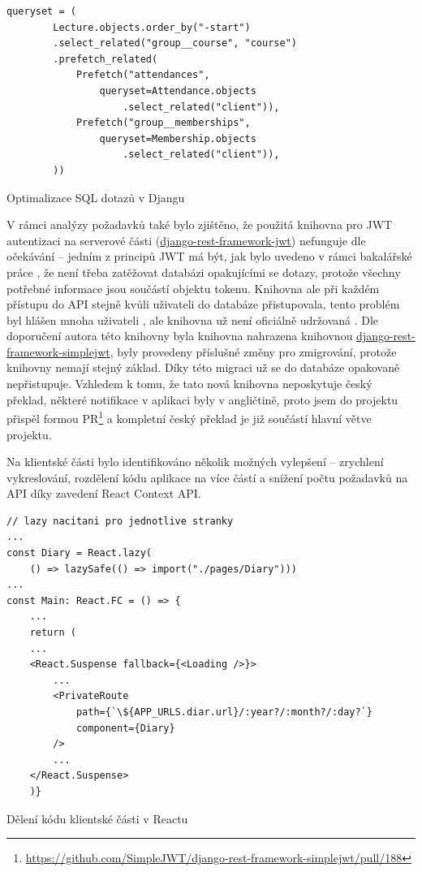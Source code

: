\begin{listing}[ht]
	\begin{verbatim}
queryset = (
        Lecture.objects.order_by("-start")
        .select_related("group__course", "course")
        .prefetch_related(
            Prefetch("attendances",
                queryset=Attendance.objects
                    .select_related("client")),
            Prefetch("group__memberships",
                queryset=Membership.objects
                    .select_related("client")),
        ))
	\end{verbatim}
	\caption{Optimalizace SQL dotazů v Djangu}\label{lst:optimalizace-django}
\end{listing}

V rámci analýzy požadavků také bylo zjištěno, že použitá knihovna pro JWT autentizaci na serverové části (\href{https://github.com/jpadilla/django-rest-framework-jwt}{django-rest-framework-jwt}) nefunguje dle očekávání -- jedním z principů JWT má být, jak bylo uvedeno v rámci bakalářské práce \cite{bp}, že není třeba zatěžovat databázi opakujícími se dotazy, protože všechny potřebné informace jsou součástí objektu tokenu. Knihovna ale při každém přístupu do API stejně kvůli uživateli do databáze přistupovala, tento problém byl hlášen mnoha uživateli \cite{django-rest-framework-jwt-issue}, ale knihovna už není oficiálně udržovaná \cite{django-rest-framework-jwt}. Dle doporučení autora této knihovny byla knihovna nahrazena knihovnou \href{https://github.com/SimpleJWT/django-rest-framework-simplejwt}{django-rest-framework-simplejwt}, byly provedeny příslušné změny pro zmigrování, protože knihovny nemají stejný základ. Díky této migraci už se do databáze opakovaně nepřistupuje. Vzhledem k tomu, že tato nová knihovna neposkytuje český překlad, některé notifikace v aplikaci byly v angličtině, proto jsem do projektu přispěl formou PR\footnote{\url{https://github.com/SimpleJWT/django-rest-framework-simplejwt/pull/188}} a kompletní český překlad je již součástí hlavní větve projektu.

Na klientské části bylo identifikováno několik možných vylepšení -- zrychlení vykreslování, rozdělení kódu aplikace na více částí a snížení počtu požadavků na API díky zavedení React Context API.

\begin{listing}[h]
	\begin{verbatim}
// lazy nacitani pro jednotlive stranky
...
const Diary = React.lazy(
    () => lazySafe(() => import("./pages/Diary")))
...
const Main: React.FC = () => {
    ...
    return (
    ...
    <React.Suspense fallback={<Loading />}>
        ...
        <PrivateRoute
            path={`\${APP_URLS.diar.url}/:year?/:month?/:day?`}
            component={Diary}
        />
        ...
    </React.Suspense>
    )}
	\end{verbatim}
	\caption{Dělení kódu klientské části v Reactu}\label{lst:optimalizace-react}
\end{listing}


